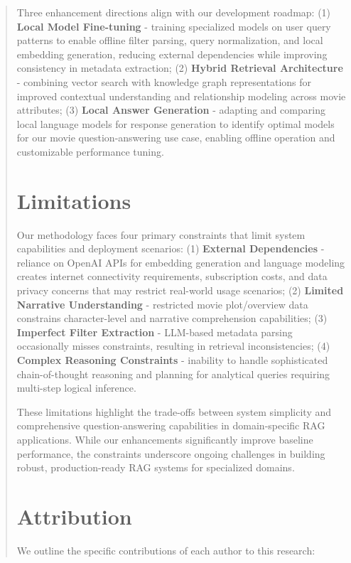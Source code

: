 \documentclass[11pt]{article}
\begin{document}
\begin{abstract}
Three enhancement directions align with our development roadmap: (1) \textbf{Local Model Fine-tuning} - training specialized models on user query patterns to enable offline filter parsing, query normalization, and local embedding generation, reducing external dependencies while improving consistency in metadata extraction; (2) \textbf{Hybrid Retrieval Architecture} - combining vector search with knowledge graph representations for improved contextual understanding and relationship modeling across movie attributes; (3) \textbf{Local Answer Generation} - adapting and comparing local language models for response generation to identify optimal models for our movie question-answering use case, enabling offline operation and customizable performance tuning.

\section*{Limitations}

Our methodology faces four primary constraints that limit system capabilities and deployment scenarios: (1) \textbf{External Dependencies} - reliance on OpenAI APIs for embedding generation and language modeling creates internet connectivity requirements, subscription costs, and data privacy concerns that may restrict real-world usage scenarios; (2) \textbf{Limited Narrative Understanding} - restricted movie plot/overview data constrains character-level and narrative comprehension capabilities; (3) \textbf{Imperfect Filter Extraction} - LLM-based metadata parsing occasionally misses constraints, resulting in retrieval inconsistencies; (4) \textbf{Complex Reasoning Constraints} - inability to handle sophisticated chain-of-thought reasoning and planning for analytical queries requiring multi-step logical inference.

These limitations highlight the trade-offs between system simplicity and comprehensive question-answering capabilities in domain-specific RAG applications. While our enhancements significantly improve baseline performance, the constraints underscore ongoing challenges in building robust, production-ready RAG systems for specialized domains.

\section{Attribution}

We outline the specific contributions of each author to this research:


\end{abstract}
\end{document}
